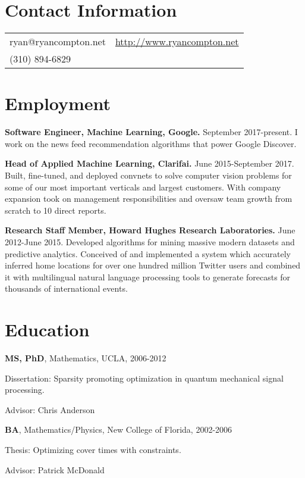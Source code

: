 \documentclass[margin,line]{res}
\newenvironment{list1}{
  \begin{list}{\ding{113}}{%
      \setlength{\itemsep}{0.0in}
      \setlength{\parsep}{0in} \setlength{\parskip}{0in}
      \setlength{\topsep}{0in} \setlength{\partopsep}{0in}
      \setlength{\leftmargin}{0.17in}}}{\end{list}}
\begin{document}

\begin{resume}
\section{\sc Contact Information}
\vspace{.05in}
\begin{tabular}{@{}p{2in}p{4in}}
    ryan@ryancompton.net   &  \url{http://www.ryancompton.net} \\
(310) 894-6829 & \\
\end{tabular}

\section{\sc Employment}

    {\bf Software Engineer, Machine Learning, Google.} September 2017-present. I work on the news feed recommendation algorithms that power Google Discover.
    
    {\bf Head of Applied Machine Learning, Clarifai.} June 2015-September 2017. Built, fine-tuned, and deployed convnets to solve computer vision problems for some of our most important verticals and largest customers. With company expansion took on management responsibilities and oversaw
team growth from scratch to 10 direct reports.

    {\bf Research Staff Member, Howard Hughes Research Laboratories.} June 2012-June 2015. Developed algorithms for mining massive modern datasets and predictive analytics. Conceived of and implemented a system which accurately inferred home locations for over one hundred million Twitter users and combined it with multilingual natural language processing tools to generate forecasts for thousands of international events.

\section{\sc Education}
    {\bf MS, PhD}, Mathematics, UCLA, 2006-2012\\
\vspace*{-.1in}
\begin{list1}
\item [] Dissertation: Sparsity promoting optimization in quantum mechanical signal processing.
\item [] Advisor: Chris Anderson
\end{list1}
    {\bf BA}, Mathematics/Physics, New College of Florida, 2002-2006\\
\vspace*{-.1in}
\begin{list1}
\item [] Thesis: Optimizing cover times with constraints.
\item [] Advisor: Patrick McDonald
\end{list1}


\end{resume}
\end{document}
